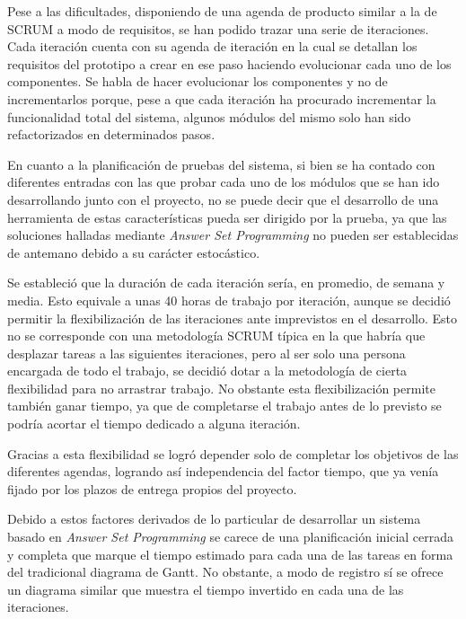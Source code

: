 Pese a las dificultades, disponiendo de una agenda de producto similar a la de SCRUM a modo de requisitos, se han podido trazar una serie de iteraciones. Cada iteración cuenta con su agenda de iteración en la cual se detallan los requisitos del prototipo a crear en ese paso haciendo evolucionar cada uno de los componentes. Se habla de hacer evolucionar los componentes y no de incrementarlos porque, pese a que cada iteración ha procurado incrementar la funcionalidad total del sistema, algunos módulos del mismo solo han sido refactorizados en determinados pasos.

En cuanto a la planificación de pruebas del sistema, si bien se ha contado con diferentes entradas con las que probar cada uno de los módulos que se han ido desarrollando junto con el proyecto, no se puede decir que el desarrollo de una herramienta de estas características pueda ser dirigido por la prueba, ya que las soluciones halladas mediante \textit{Answer Set Programming} no pueden ser establecidas de antemano debido a su carácter estocástico.

Se estableció que la duración de cada iteración sería, en promedio, de semana y media. Esto equivale a unas 40 horas de trabajo por iteración, aunque se decidió permitir la flexibilización de las iteraciones ante imprevistos en el desarrollo. Esto no se corresponde con una metodología SCRUM típica en la que habría que desplazar tareas a las siguientes iteraciones, pero al ser solo una persona encargada de todo el trabajo, se decidió dotar a la metodología de cierta flexibilidad para no arrastrar trabajo. No obstante esta flexibilización permite también ganar tiempo, ya que de completarse el trabajo antes de lo previsto se podría acortar el tiempo dedicado a alguna iteración.

Gracias a esta flexibilidad se logró depender solo de completar los objetivos de las diferentes agendas, logrando así independencia del factor tiempo, que ya venía fijado por los plazos de entrega propios del proyecto. 

Debido a estos factores derivados de lo particular de desarrollar un sistema basado en \textit{Answer Set Programming} se carece de una planificación inicial cerrada y completa que marque el tiempo estimado para cada una de las tareas en forma del tradicional diagrama de Gantt. No obstante, a modo de registro sí se ofrece un diagrama similar que muestra el tiempo invertido en cada una de las iteraciones.

